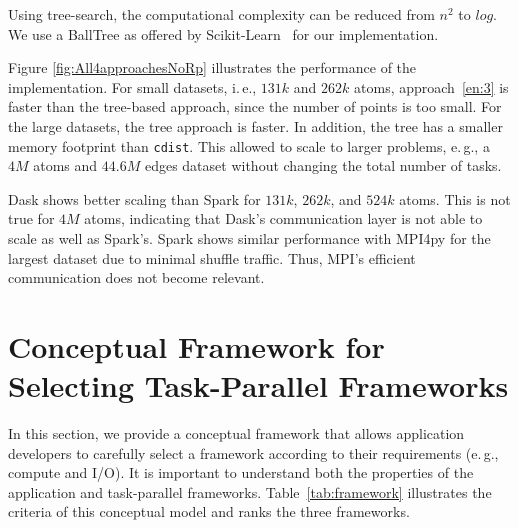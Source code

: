 Using tree-search, the computational complexity can be reduced from $n^2$ to $log$. 
We use a BallTree as offered by Scikit-Learn~\cite{scikit-nearest} for our implementation.

Figure \ref{fig:All4approachesNoRp} illustrates the performance of the implementation.
For small datasets, i.\,e., $131k$ and $262k$ atoms, approach~\ref{en:3} is faster than the tree-based approach, since the number of points is too small.
For the large datasets, the tree approach is faster.
In addition, the tree has a smaller memory footprint than \texttt{cdist}.
This allowed to scale to larger problems, e.\,g., a $4M$ atoms and $44.6M$ edges dataset without changing the total number of tasks.

Dask shows better scaling than Spark for $131k$, $262k$, and $524k$ atoms.
This is not true for $4M$ atoms, indicating that Dask's communication layer is not able to scale as well as Spark's.
Spark shows similar performance with MPI4py for the largest dataset due to minimal shuffle traffic.
Thus, MPI's efficient communication does not become relevant.

\section{Conceptual Framework for Selecting Task-Parallel Frameworks}
\label{sec:task_sel_model}
In this section, we provide a conceptual framework that allows application developers to carefully select a framework according to their requirements (e.\,g., compute and I/O).
It is important to understand both the properties of the application and task-parallel frameworks.
Table~\ref{tab:framework} illustrates the criteria of this conceptual model and ranks the three frameworks.

